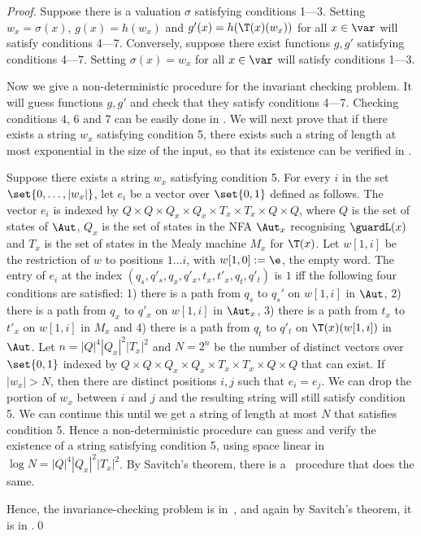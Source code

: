 \begin{proof}
	Suppose there is a valuation $\sigma$ satisfying conditions 1---3. Setting $w_x=\sigma(x)$, $g(x)=h(w_x)$ and $g'(x)=h(\T(x)(w_x))$ for
	all $x\in \var$ will satisfy conditions 4---7. Conversely, suppose there exist functions $g,g'$ satisfying conditions 4---7. Setting
	$\sigma(x)=w_x$ for all $x \in \var$ will satisfy conditions 1---3.

	Now we give a non-deterministic \psp{} procedure for the invariant checking problem. It will guess functions $g,g'$ and check that they
	satisfy conditions 4---7. Checking conditions 4, 6 and 7 can be easily done in \psp{}. We will next prove that if there exists a string
	$w_x$ satisfying condition 5, there exists such a string of length at most exponential in the size of the input, so that its existence can
	be verified in \psp{}.

	Suppose there exists a string $w_x$ satisfying condition 5. For every $i$ in the set $\set{0,\ldots,|w_x|}$, let $e_i$ be a vector over
	$\set{0,1}$ defined as follows. The vector $e_i$ is indexed by $Q\times Q\times Q_x\times Q_x\times T_x\times T_x \times Q\times Q$,
	where $Q$ is the set of states of $\Aut$, $Q_x$ is the set of states in the NFA $\Aut_x$ recognising $\guardL(x)$ and $T_x$ is the set of
	states in the Mealy machine $M_x$ for $\T(x)$. Let $w[1,i]$ be the restriction of $w$ to positions $1 \ldots i$, with $w[1,0] := \e$, the empty word.
	The entry of $e_i$ at the index $(q_s^{},q'_s, q_x^{},q'_x,t_x^{},t'_x,q_t^{},q'_t)$ is $1$ iff the following four conditions are
	satisfied: 1) there is a path from $q_s$ to $q_s'$ on $w[1,i]$ in $\Aut$, 2) there is a path from $q_x$ to $q'_x$ on $w[1,i]$ in $\Aut_x$,
	3) there is a path from $t_x$ to $t'_x$ on $w[1,i]$ in $M_x$ and 4) there is a path from $q_t$ to $q'_t$ on $\T(x)(w[1,i])$ in $\Aut$.
	Let $n=|Q|^4 |Q_x|^2|T_x|^2$ and $N=2^n$ be the number of distinct vectors over $\set{0,1}$ indexed by
	$Q\times Q\times Q_x\times Q_x\times T_x \times T_x \times Q\times Q$ that can exist. If $|w_x| > N$, then there are distinct positions
	$i,j$ such that $e_i = e_j$. We can drop the portion of $w_x$ between $i$ and $j$ and the resulting string will still satisfy condition 5.
	We can continue this until we get a string of length at most $N$ that satisfies condition 5. Hence a non-deterministic \psp{} procedure can
	guess and verify the existence of a string satisfying condition 5, using space linear in $\log N=|Q|^4 |Q_x|^2|T_x|^2$. By Savitch's
	theorem, there is a \psp\ procedure that does the same.

	Hence, the invariance-checking problem is in \npsp\,, and again by Savitch's theorem, it is in \psp{}.\qed
\end{proof}

